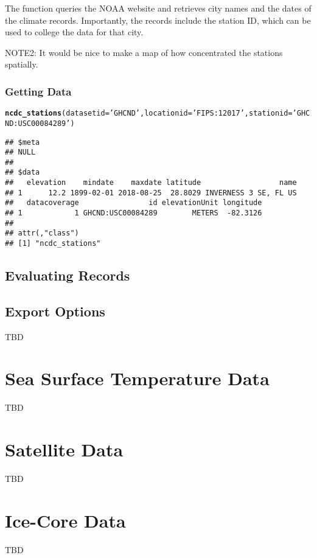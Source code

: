 \documentclass{article}\usepackage[]{graphicx}\usepackage[]{color}
\makeatletter
\newcommand{\hlstr}[1]{\textcolor[rgb]{0.192,0.494,0.8}{#1}}%
\newcommand{\hlstd}[1]{\textcolor[rgb]{0.345,0.345,0.345}{#1}}%
\newcommand{\hlkwc}[1]{\textcolor[rgb]{0.333,0.667,0.333}{#1}}%
\newcommand{\hlkwd}[1]{\textcolor[rgb]{0.737,0.353,0.396}{\textbf{#1}}}%
\newenvironment{kframe}{%
 \def\at@end@of@kframe{}%
 \ifinner\ifhmode%
  \def\at@end@of@kframe{\end{minipage}}%
  \begin{minipage}{\columnwidth}%
 \fi\fi%
 \def\FrameCommand##1{\hskip\@totalleftmargin \hskip-\fboxsep
 \colorbox{shadecolor}{##1}\hskip-\fboxsep
     \hskip-\linewidth \hskip-\@totalleftmargin \hskip\columnwidth}%
 \MakeFramed {\advance\hsize-\width
   \@totalleftmargin\z@ \linewidth\hsize
   \@setminipage}}%
 {\par\unskip\endMakeFramed%
 \at@end@of@kframe}
\newenvironment{knitrout}{}{} %
\makeatother
\begin{document}
The function queries the NOAA website and retrieves city names and the dates of the climate records. Importantly, the records include the station ID, which can be used to college the data for that city. 


NOTE2: It would be nice to make a map of how concentrated the stations spatially. 

\subsubsection{Getting Data}

\begin{knitrout}
\color{fgcolor}\begin{kframe}
\begin{alltt}
\hlkwd{ncdc_stations}\hlstd{(}\hlkwc{datasetid}\hlstd{=}\hlstr{'GHCND'}\hlstd{,} \hlkwc{locationid}\hlstd{=}\hlstr{'FIPS:12017'}\hlstd{,} \hlkwc{stationid}\hlstd{=}\hlstr{'GHCND:USC00084289'}\hlstd{)}
\end{alltt}
\begin{verbatim}
## $meta
## NULL
## 
## $data
##   elevation    mindate    maxdate latitude                  name
## 1      12.2 1899-02-01 2018-08-25  28.8029 INVERNESS 3 SE, FL US
##   datacoverage                id elevationUnit longitude
## 1            1 GHCND:USC00084289        METERS  -82.3126
## 
## attr(,"class")
## [1] "ncdc_stations"
\end{verbatim}
\end{kframe}
\end{knitrout}

\subsection{Evaluating Records}



\subsection{Export Options}

TBD

\section{Sea Surface Temperature Data}

TBD 

\section{Satellite Data}

TBD

\section{Ice-Core Data}

TBD
\end{document}
